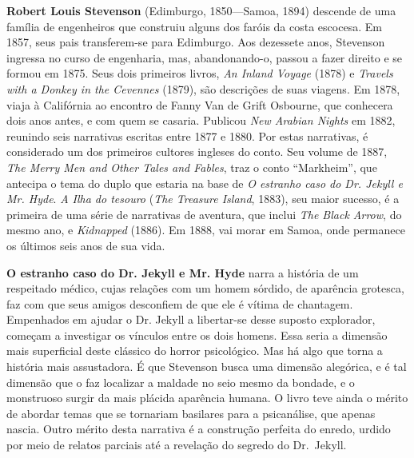 \textbf{Robert Louis Stevenson} (Edimburgo, 1850---Samoa, 1894) 
descende de uma família de engenheiros que construiu alguns dos 
faróis da costa escocesa. Em 1857, seus pais transferem-se para 
Edimburgo. Aos dezessete anos, Stevenson ingressa no curso de 
engenharia, mas, abandonando-o, passou a fazer direito e se formou em 1875. 
Seus dois primeiros livros, \textit{An Inland Voyage} (1878) e \textit{Travels with a Donkey in the 
Cevennes} (1879), são descrições de suas viagens. Em 1878, viaja 
à Califórnia ao encontro de Fanny Van de Grift Osbourne, que 
conhecera dois anos antes, e com quem se casaria. Publicou \textit{New 
Arabian Nights} em 1882, reunindo seis narrativas escritas 
entre 1877 e 1880. Por estas narrativas, é considerado um dos 
primeiros cultores ingleses do conto. Seu volume de 1887, 
\textit{The Merry Men and Other Tales and Fables}, traz o conto ``Markheim'', 
que antecipa o tema do duplo que estaria na base de \textit{O estranho caso 
do Dr. Jekyll e Mr. Hyde}. \textit{A Ilha do tesouro} (\textit{The Treasure Island}, 
1883), seu maior sucesso, é a primeira de uma série de narrativas 
de aventura, que inclui \textit{The Black Arrow}, do mesmo ano, e \textit{Kidnapped} 
(1886). Em 1888, vai morar em Samoa, onde permanece os últimos seis anos de sua vida.  

\textbf{O estranho caso do Dr. Jekyll e Mr. Hyde} narra a história 
de um respeitado médico, cujas relações com um homem sórdido, 
de aparência grotesca, faz com que seus amigos desconfiem de que 
ele é vítima de chantagem. Empenhados em ajudar o Dr. Jekyll
a libertar-se desse suposto explorador, começam a investigar os 
vínculos entre os dois homens. Essa seria a dimensão mais 
superficial deste clássico do horror psicológico.
Mas há algo que torna a história mais assustadora. É que Stevenson
busca uma dimensão alegórica, e é tal dimensão que o faz localizar 
a maldade no seio mesmo da bondade, e o monstruoso surgir da mais 
plácida aparência humana. O livro teve ainda o mérito de abordar 
temas que se tornariam basilares para a psicanálise, que apenas
nascia. Outro mérito desta narrativa é a construção perfeita 
do enredo, urdido por meio de relatos parciais até a revelação 
do segredo do Dr.~Jekyll. 
        
